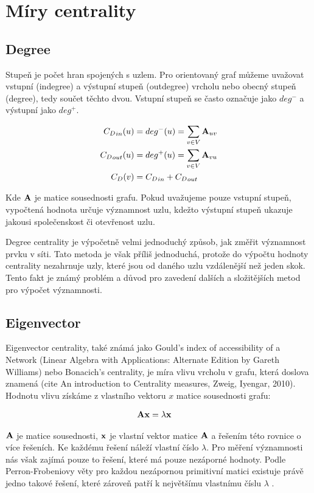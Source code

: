 \documentclass[12pt,titlepage]{report}
\begin{document}
\section{Míry centrality}
\subsection{Degree}
Stupeň je počet hran spojených s uzlem. Pro orientovaný graf můžeme uvažovat
vstupní (indegree) a výstupní stupeň (outdegree) vrcholu nebo obecný stupeň
(degree), tedy součet těchto dvou.  Vstupní stupeň se často označuje jako
$deg^-$ a výstupní jako $deg^+$. 

\begin{align}
\label{eq:degree}
{C_D}_{in}(u) &= deg^-(u)  = \displaystyle\sum\limits_{v \in V} {\bf A}_{uv} \\
{C_D}_{out}(u) &= deg^+(u) = \displaystyle\sum\limits_{v \in V} {\bf A}_{vu} \\
{C_D}(v) &= {C_D}_{in} + {C_D}_{out}
\end{align}

Kde ${\bf A}$ je matice sousednosti grafu. Pokud uvažujeme pouze vstupní
stupeň, vypočtená hodnota určuje významnost uzlu, kdežto výstupní stupeň
ukazuje jakousi společenskost či otevřenost uzlu. 

Degree centrality je výpočetně velmi jednoduchý způsob, jak změřit významnost
prvku v síti. Tato metoda je však příliš jednoduchá, protože do výpočtu hodnoty
centrality nezahrnuje uzly, které jsou od daného uzlu vzdálenější než jeden
skok. Tento fakt je známý problém a důvod pro zavedení dalších a složitějších
metod pro výpočet významnosti.



\subsection{Eigenvector}
Eigenvector centrality, také známá jako Gould's index of accessibility of a
Network (Linear Algebra with Applications: Alternate Edition by Gareth
Williams) nebo Bonacich's centrality, je míra vlivu vrcholu v grafu, která
doslova znamená  (cite An introduction to Centrality measures, Zweig, Iyengar, 2010). Hodnotu vlivu získáme z
vlastního vektoru $x$ matice sousednosti grafu:

\begin{align}
{\bf Ax} &= \lambda {\bf x}
\end{align}

${\bf A}$ je matice sousednosti, ${\bf x}$ je vlastní vektor
matice ${\bf A}$ a řešením této rovnice o více řešeních. Ke každému řešení
náleží vlastní číslo $\lambda$. Pro měření významnosti nás však zajímá pouze to
řešení, které má pouze nezáporné hodnoty. Podle Perron-Frobeniovy věty pro
každou nezápornou primitivní matici existuje právě jedno takové řešení, které
zároveň patří k největšímu vlastnímu číslu $\lambda$ \cite{langvillemeyer}.
\end{document}
